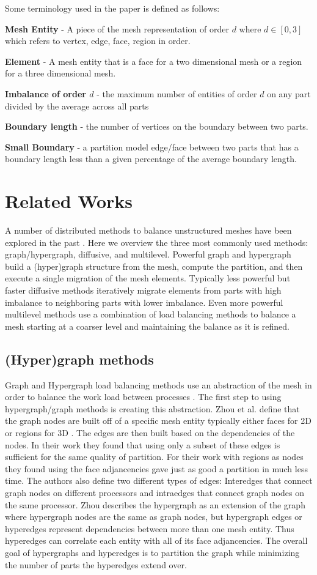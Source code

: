 \documentclass{thesis}
\begin{document}
Some terminology used in the paper is defined as follows:

{\bf Mesh Entity } - A piece of the mesh representation of order $d$ where $d \in [0,3]$ which refers to vertex, edge, face, region in order.

{\bf Element} - A mesh entity that is a face for a two dimensional mesh or a region for a three dimensional mesh.

{\bf Imbalance of order $d$} - the maximum number of entities of order $d$ on any part divided by the average across all parts

{\bf Boundary length} - the number of vertices on the boundary between two parts.

{\bf Small Boundary} - a partition model edge/face between two parts that has a boundary length less than a given percentage of the average boundary length.


\chapter{Related Works}
A number of distributed methods to balance unstructured meshes have been 
explored in the past \cite{multidiffuse,surveygraph}. Here we overview the 
three most commonly used methods: graph/hypergraph, diffusive, and multilevel. 
Powerful graph and hypergraph build a (hyper)graph structure from the mesh, 
compute the partition, and then execute a single migration of the mesh 
elements. Typically less powerful but faster diffusive methods iteratively 
migrate elements from parts with high imbalance to neighboring parts with 
lower imbalance. Even more powerful multilevel methods use a combination of 
load balancing methods to balance a mesh starting at a coarser level and 
maintaining the balance as it is refined.

\section{(Hyper)graph methods}
Graph and Hypergraph load balancing methods use an abstraction of the mesh in 
order to balance the work load between processes \cite{surveygraph}. The 
first step to using 
hypergraph/graph methods is creating this abstraction. Zhou et al. define that 
the graph nodes are built off of a specific mesh entity typically either faces 
for 2D or regions for 3D \cite{zhougraph}. The edges are then built based on the
dependencies of the nodes. In their work they found that using only a subset of 
these edges is sufficient for the same quality of partition. For their work with
regions as nodes they found using the face adjancencies gave just as good a 
partition in much less time. The authors also define two different types of 
edges: Interedges that connect graph nodes on different processors and 
intraedges that connect graph nodes on the same processor. Zhou describes the 
hypergraph as an extension of the graph where hypergraph nodes are the same as 
graph nodes, but hypergraph edges or hyperedges represent dependencies between 
more than one mesh entity. Thus hyperedges can correlate each entity with all 
of its face adjancencies. The overall goal of hypergraphs and hyperedges is to 
partition the graph while minimizing the number of parts the hyperedges extend 
over.
\end{document}
